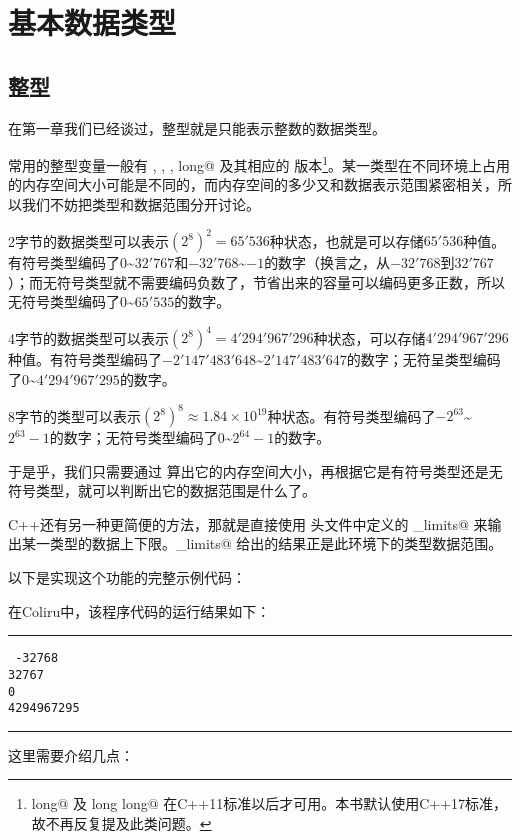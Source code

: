 \section{基本数据类型}
\subsection*{整型}
在第一章我们已经谈过，整型就是只能表示整数的数据类型。\par
常用的整型变量一般有 \lstinline@short@, \lstinline@int@, \lstinline@long@, \lstinline@long long@ 及其相应的 \lstinline@unsigned@ 版本\footnote{\lstinline@long long@ 及 \lstinline@unsigned long long@ 在C++11标准以后才可用。本书默认使用C++17标准，故不再反复提及此类问题。}。某一类型在不同环境上占用的内存空间大小可能是不同的，而内存空间的多少又和数据表示范围紧密相关，所以我们不妨把类型和数据范围分开讨论。\par
2字节的数据类型可以表示$(2^8)^2=65'536$种状态，也就是可以存储$65'536$种值。有符号类型编码了$0$\~{}$32'767$和$-32'768$\~{}$-1$的数字（换言之，从$-32'768$到$32'767$）；而无符号类型就不需要编码负数了，节省出来的容量可以编码更多正数，所以无符号类型编码了$0$\~{}$65'535$的数字。\par
4字节的数据类型可以表示$(2^8)^4=4'294'967'296$种状态，可以存储$4'294'967'296$种值。有符号类型编码了$-2'147'483'648$\~{}$2'147'483'647$的数字；无符呈类型编码了$0$\~{}$4'294'967'295$的数字。\par
8字节的类型可以表示$(2^8)^8\approx1.84\times10^{19}$种状态。有符号类型编码了$-2^{63}$\~{}$2^{63}-1$的数字；无符号类型编码了$0$\~{}$2^{64}-1$的数字。\par
于是乎，我们只需要通过 \lstinline@sizeof@ 算出它的内存空间大小，再根据它是有符号类型还是无符号类型，就可以判断出它的数据范围是什么了。\par
C++还有另一种更简便的方法，那就是直接使用 \lstinline@limits@ 头文件中定义的 \lstinline@numeric_limits@ 来输出某一类型的数据上下限。\lstinline@numeric_limits@ 给出的结果正是此环境下的类型数据范围。\par
以下是实现这个功能的完整示例代码：

在Coliru中，该程序代码的运行结果如下：\\\noindent\rule{\textwidth}{.2pt}\texttt{
-32768\\
32767\\
0\\
4294967295
}\\\noindent\rule{\textwidth}{.2pt}\par
这里需要介绍几点：\par
